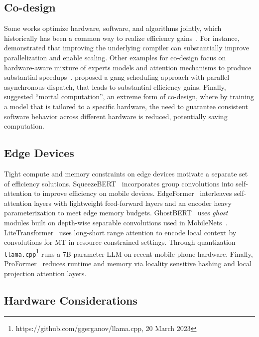 \subsection{Co-design}
Some works optimize hardware, software, and algorithms jointly, which historically has been a common way to realize efficiency gains~\citep{Hooker2021}. For instance,~\citet{Lepikhin2021GShardSG} demonstrated that improving the underlying compiler can substantially improve parallelization and enable scaling. Other examples for co-design focus on hardware-aware mixture of experts models and attention mechanisms to produce substantial speedups~\citep{Jiaao2022,Rajbhandari2022,Dao2022-yl}. 
\citet{Barham2022} proposed a gang-scheduling approach with parallel asynchronous dispatch, that leads to substantial efficiency gains.
Finally,~\citet{hinton2022forward} suggested ``mortal computation'', an extreme form of co-design, where by training a model that is tailored to a specific hardware, the need to guarantee consistent software behavior across different hardware is reduced, potentially saving computation.

\subsection{Edge Devices} Tight compute and memory constraints on edge devices motivate a separate set of efficiency solutions. SqueezeBERT~\cite{iandolaSqueezeBERTWhatCan2020a} incorporates group convolutions into self-attention to improve efficiency on mobile devices. EdgeFormer~\cite{geEdgeFormerParameterEfficientTransformer2022} interleaves self-attention layers with lightweight feed-forward layers and an encoder heavy parameterization to meet edge memory budgets. GhostBERT~\cite{huangGhostBERTGenerateMore2021} uses \textit{ghost} modules built on depth-wise separable convolutions used in MobileNets~\cite{howardMobileNetsEfficientConvolutional2017}. LiteTransformer~\cite{wu*LiteTransformerLongShort2022} uses long-short range attention to encode local context by convolutions for MT in resource-constrained settings. Through quantization \texttt{llama.cpp}\footnote{https://github.com/ggerganov/llama.cpp, 20 March 2023} runs a 7B-parameter LLM on recent mobile phone hardware. Finally, ProFormer~\cite{sankarProFormerOnDeviceLSH2021} reduces runtime and memory via locality sensitive hashing and local projection attention layers.

\subsection{Hardware Considerations}


